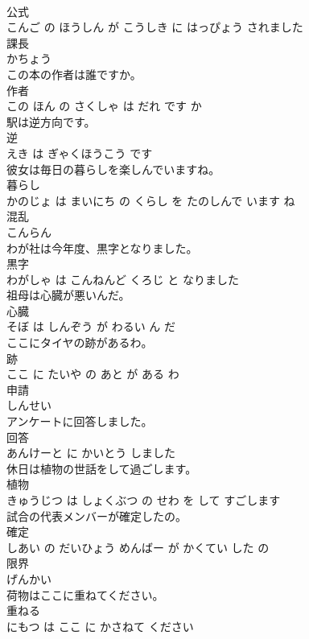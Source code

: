 \documentclass[8pt]{extreport}
\begin{document}
\begin{CJK}{UTF8}{min}
\\	公式 
\\	こんご の ほうしん が こうしき に はっぴょう されました		
\\	課長	
\\	かちょう		
\\	この本の作者は誰ですか。	
\\	作者 
\\	この ほん の さくしゃ は だれ です か		
\\	駅は逆方向です。	
\\	逆 
\\	えき は ぎゃくほうこう です		
\\	彼女は毎日の暮らしを楽しんでいますね。	
\\	暮らし 
\\	かのじょ は まいにち の くらし を たのしんで います ね		
\\	混乱	
\\	こんらん		
\\	わが社は今年度、黒字となりました。	
\\	黒字 
\\	わがしゃ は こんねんど くろじ と なりました		
\\	祖母は心臓が悪いんだ。	
\\	心臓 
\\	そぼ は しんぞう が わるい ん だ		
\\	ここにタイヤの跡があるわ。	
\\	跡 
\\	ここ に たいや の あと が ある わ		
\\	申請	
\\	しんせい		
\\	アンケートに回答しました。	
\\	回答 
\\	あんけーと に かいとう しました		
\\	休日は植物の世話をして過ごします。	
\\	植物 
\\	きゅうじつ は しょくぶつ の せわ を して すごします		
\\	試合の代表メンバーが確定したの。	
\\	確定 
\\	しあい の だいひょう めんばー が かくてい した の		
\\	限界	
\\	げんかい		
\\	荷物はここに重ねてください。	
\\	重ねる 
\\	にもつ は ここ に かさねて ください		

\end{CJK}
\end{document}
